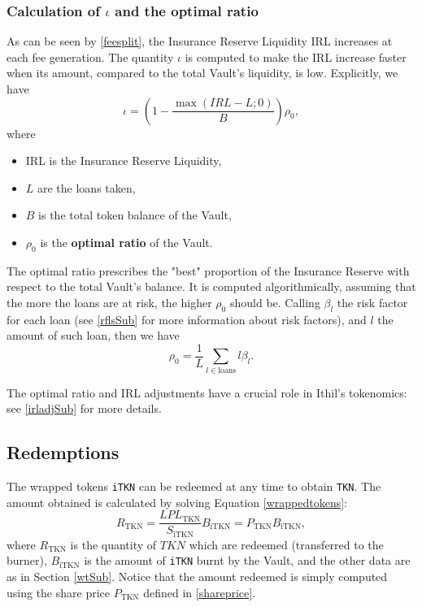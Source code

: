 \documentclass[a4paper,10 pt]{article}
\theoremstyle{definition}
\begin{document}
\subsubsection{Calculation of $\iota$ and the optimal ratio}\label{iotaSubSub}

As can be seen by \eqref{feesplit}, the Insurance Reserve Liquidity IRL increases at each fee generation. The quantity $\iota$ is computed to make the IRL increase faster when its amount, compared to the total Vault's liquidity, is low. Explicitly, we have
\begin{equation}\label{iota}
\iota = \left(1-\frac{\max(IRL-L;0)}{B}\right)\rho_0,
\end{equation}
where 
\begin{itemize}
\item IRL is the Insurance Reserve Liquidity,
\item $L$ are the loans taken,
\item $B$ is the total token balance of the Vault,
\item $\rho_0$ is the {\bf optimal ratio} of the Vault.
\end{itemize}

The optimal ratio prescribes the "best" proportion of the Insurance Reserve with respect to the total Vault's balance. It is computed algorithmically, assuming that the more the loans are at risk, the higher $\rho_0$ should be. Calling $\beta_l$ the risk factor for each loan (see \ref{rflsSub} for more information about risk factors), and $l$ the amount of such loan, then we have
\begin{equation}\label{optimalratio}
\rho_0 = \frac{1}{L}\sum_{l \in \text{loans}}l \beta_l.
\end{equation}

The optimal ratio and IRL adjustments have a crucial role in Ithil's tokenomics: see \ref{irladjSub} for more details.

\subsection{Redemptions}\label{redSub}

The wrapped tokens \verb|iTKN| can be redeemed at any time to obtain \verb|TKN|. The amount obtained is calculated by solving Equation \eqref{wrappedtokens}:
\begin{equation}\label{redemptions}
R_{\text{TKN}} = \frac{LPL_{\text{TKN}}}{S_{\text{iTKN}}}B_{\text{iTKN}} = P_{\text{TKN}} B_{\text{iTKN}},
\end{equation}
where $R_{\text{TKN}}$ is the quantity of $TKN$ which are redeemed (transferred to the burner), $B_{\text{iTKN}}$ is the amount of \verb|iTKN| burnt by the Vault, and the other data are as in Section \ref{wtSub}. Notice that the amount redeemed is simply computed using the share price $P_{\text{TKN}}$ defined in \eqref{shareprice}.
\end{document}

